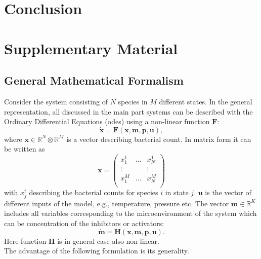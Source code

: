 \documentclass[10pt,A4paper]{article}
\numberwithin{equation}{section}
\newcommand{\beginsupplement}{%
  \renewcommand{\thesection}{}
  \setcounter{subsection}{0}
  \renewcommand{\thesubsection}{S\arabic{subsection}}
  \setcounter{table}{0}
  \renewcommand{\thetable}{S\arabic{table}}%
  \setcounter{figure}{0}
  \renewcommand{\thefigure}{S\arabic{figure}}%
  \setcounter{listing}{0}
  \renewcommand{\thelisting}{S\arabic{listing}}
}
\newcommand{\mbx}{\mathbf{x}}
\newcommand{\mbm}{\mathbf{m}}
\newcommand{\mbp}{\mathbf{p}}
\newcommand{\mbu}{\mathbf{u}}
\newcommand{\mbF}{\mathbf{F}}
\newcommand{\mbH}{\mathbf{H}}
\begin{document}
\section{Conclusion}
\newpage
\printbibliography

\beginsupplement
\section{Supplementary Material}
\subsection{General Mathematical Formalism}  \label{ssec:supplement1}
Consider the system consisting of $N$ species in $M$ different states.
In the general representation, all discussed in the main part systems  can be described with the Ordinary Differential Equations (\acp{ode}) using a non-linear function $\mbF$:
\begin{equation}
   \dot{\mbx} = \mbF(\mbx, \mbm, \mbp, \mbu),
\label{eq:model_ODE_x}
\end{equation}
where  $\mbx \in \mathbb{R}^{N}  \otimes \mathbb{R}^{M}$ is a vector describing bacterial count.
In matrix form it can be written as
\begin{equation}
    \mbx = \begin{pmatrix}
        x^1_1  & \dots & x^1_N  \\
        \vdots &       & \vdots \\
        x^M_1  & \dots & x^M_N  \\
            \end{pmatrix}
    \label{eq:model_bact}
\end{equation}
with $x_{j}^{i}$ describing the bacterial counts for species $i$ in state $j$.
$\mbu$ is the vector of different inputs of the model, e.g., temperature, pressure etc.
The vector $\mbm \in \mathbb{R}^{K}$ includes all variables corresponding to the microenvironment of the system which can be concentration of the inhibitors or activators:
\begin{equation}
    \dot{\mbm} = \mbH (\mbx, \mbm, \mbp, \mbu).
    \label{eq:model_microenv}
\end{equation}
Here function $\mbH$ is in general case also non-linear.\\
%
The advantage of the following formulation is its generality.
\end{document}
